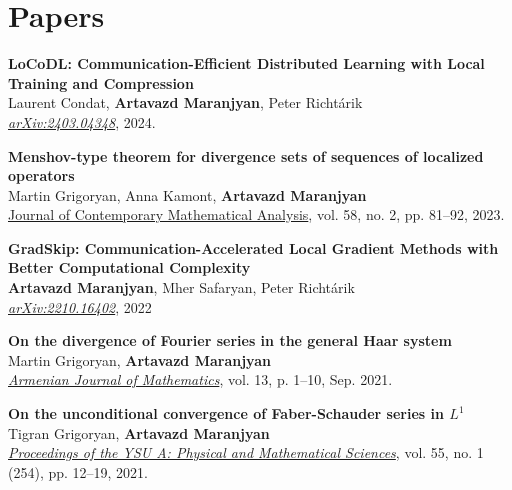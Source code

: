 \documentclass[11pt,a4paper,sans]{moderncv}        %
\begin{document}
\section{Papers}
\begin{etaremune}

\item \textbf{LoCoDL: Communication-Efficient Distributed Learning with Local Training and Compression}\\
Laurent Condat, \textbf{Artavazd Maranjyan}, Peter Richtárik\\
\textcolor{accent}{\href{https://arxiv.org/abs/2403.04348}{\textit{arXiv:2403.04348}}}, 2024.

\vspace{2mm}

\item \textbf{Menshov-type theorem for divergence sets of sequences of localized operators}\\
Martin Grigoryan, Anna Kamont, \textbf{Artavazd Maranjyan}\\
\href{https://doi.org/10.3103/S106836232302005X}{Journal of Contemporary Mathematical Analysis}, vol. 58, no. 2, pp. 81–92, 2023.

\vspace{2mm}

\item \textbf{GradSkip: Communication-Accelerated Local Gradient Methods with Better Computational Complexity}\\
\textbf{Artavazd Maranjyan}, Mher Safaryan, Peter Richtárik\\
\textcolor{accent}{\href{https://arxiv.org/abs/2210.16402}{\textit{arXiv:2210.16402}}}, 2022

\vspace{2mm}

\item \textbf{On the divergence of Fourier series in the general Haar system}\\
Martin Grigoryan, \textbf{Artavazd Maranjyan}\\ \textcolor{accent}{\href{https://doi.org/10.52737/18291163-2021.13.6-1-10}{\textit{Armenian Journal of Mathematics}}}, vol. 13, p. 1–10, Sep. 2021.

\vspace{2mm}

\item \textbf{On the unconditional convergence of Faber-Schauder series in $L^1$}\\
Tigran Grigoryan, \textbf{Artavazd Maranjyan}\\
\textcolor{accent}{\href{http://www.old.ysu.am/files/vol55\_no1\_2021\_pp12\%E2\%80\%9319.pdf}{\textit{Proceedings of the YSU A: Physical and Mathematical Sciences}}}, vol. 55, no. 1 (254), pp. 12–19, 2021.
\end{etaremune}
\end{document}
